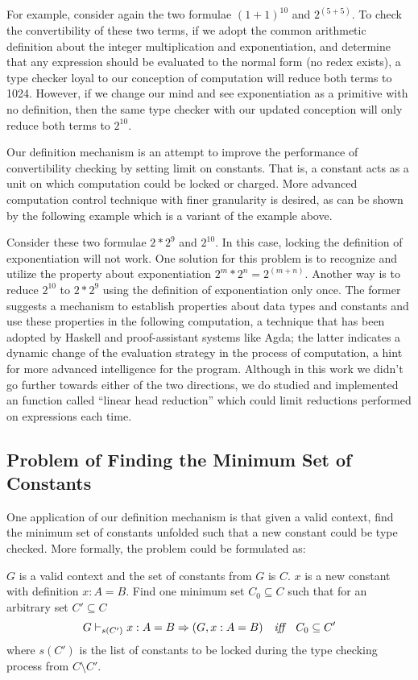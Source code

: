 For example, consider again the two formulae $(1 + 1)^{10}$ and $2^{(5+5)}$. To check the convertibility of these two terms, if we adopt the common arithmetic definition about the integer multiplication and exponentiation, and determine that any expression should be evaluated to the normal form (no redex exists), a type checker loyal to our conception of computation will reduce both terms to 1024. However, if we change our mind and see exponentiation as a primitive with no definition, then the same type checker with our updated conception will only reduce both terms to $2^{10}$.

Our definition mechanism is an attempt to improve the performance of convertibility checking by setting limit on constants. That is, a constant acts as a unit on which computation could be locked or charged. More advanced computation control technique with finer granularity is desired, as can be shown by the following example which is a variant of the example above.

Consider these two formulae $2 * 2^9$ and $2^{10}$. In this case, locking the definition of exponentiation will not work. One solution for this problem is to recognize and utilize the property about exponentiation $2^m * 2^n = 2^{(m+n)}$. Another way is to reduce $2^{10}$ to $2 * 2^9$ using the definition of exponentiation only once. The former suggests a mechanism to establish properties about data types and constants and use these properties in the following computation, a technique that has been adopted by Haskell and proof-assistant systems like Agda; the latter indicates a dynamic change of the evaluation strategy in the process of computation, a hint for more advanced intelligence for the program. Although in this work we didn't go further towards either of the two directions, we do studied and implemented an function called ``linear head reduction'' which could limit reductions performed on expressions each time.

\subsection{Problem of Finding the Minimum Set of Constants}\label{theory:find-minimum}
One application of our definition mechanism is that given a valid context, find the minimum set of constants unfolded such that a new constant could be type checked. More formally, the problem could be formulated as:
\begin{problem}
  $G$ is a valid context and the set of constants from $G$ is $C$. $x$ is a new constant with definition $x:A=B$. Find one minimum set $C_0 \subseteq C$ such that for an arbitrary set $C' \subseteq C$
  \[ G \vdash_{s(C')} x:A=B \Rightarrow (G, x:A=B) \quad \emph{iff} \quad C_0 \subseteq C' \]
  where $s(C')$ is the list of constants to be locked during the type checking process from $C \setminus C'$.
\end{problem}

